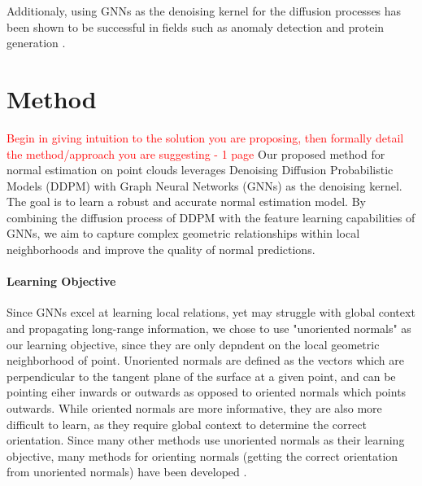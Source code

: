 \documentclass{acmart}
\newcommand{\instructions}[1]{\textcolor{red}{#1}\newline}
\begin{document}
Additionaly, using GNNs as the denoising kernel for the diffusion processes has been shown to be successful in fields such as anomaly detection \cite{ConGNN_2024} and protein generation \cite{ingraham2023illuminating}.

\section{Method}
\instructions{Begin in giving intuition to the solution you are proposing, then formally detail the method/approach you are suggesting -  1 page}
Our proposed method for normal estimation on point clouds leverages Denoising Diffusion Probabilistic Models (DDPM) with Graph Neural Networks (GNNs) as the denoising kernel. The goal is to learn a robust and accurate normal estimation model. By combining the diffusion process of DDPM with the feature learning capabilities of GNNs, we aim to capture complex geometric relationships within local neighborhoods and improve the quality of normal predictions.

\paragraph{Learning Objective}
Since GNNs excel at learning local relations, yet may struggle with global context and propagating long-range information, we chose to use "unoriented normals" as our learning objective, since they are only depndent on the local geometric neighborhood of point. Unoriented normals are defined as the vectors which are perpendicular to the tangent plane of the surface at a given point, and can be pointing eiher inwards or outwards as opposed to oriented normals which points outwards. While oriented normals are more informative, they are also more difficult to learn, as they require global context to determine the correct orientation. Since many other methods use unoriented normals as their learning objective, many methods for orienting normals (getting the correct orientation from unoriented normals) have been developed \cite{xu2023globally,gotsman2024linear}.
\end{document}
